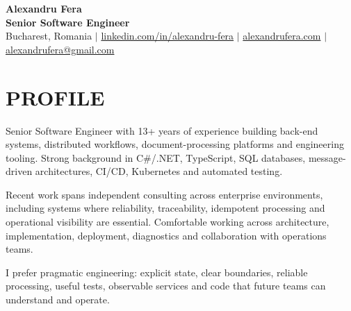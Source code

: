 \documentclass[letterpaper,11pt]{article}
\begin{document}
\begin{center}
    \textbf{\Huge Alexandru Fera} \\ \vspace{5pt}
    \textbf{Senior Software Engineer} \\ \vspace{5pt}
    Bucharest, Romania \hspace{1pt} $|$
    \href{https://www.linkedin.com/in/alexandru-fera/}{linkedin.com/in/alexandru-fera} \hspace{1pt} $|$
    \href{https://alexandrufera.com}{alexandrufera.com} \hspace{1pt} $|$
    \href{mailto:alexandrufera@gmail.com}{alexandrufera@gmail.com}
    \\ \vspace{-3pt}
\end{center}

\section{PROFILE}
\small{
Senior Software Engineer with 13+ years of experience building back-end systems, distributed workflows, document-processing platforms and engineering tooling. Strong background in C\#/.NET, TypeScript, SQL databases, message-driven architectures, CI/CD, Kubernetes and automated testing.


\vspace{4pt}
Recent work spans independent consulting across enterprise environments, including systems where reliability, traceability, idempotent processing and operational visibility are essential. Comfortable working across architecture, implementation, deployment, diagnostics and collaboration with operations teams.

\vspace{4pt}
I prefer pragmatic engineering: explicit state, clear boundaries, reliable processing, useful tests, observable services and code that future teams can understand and operate.
}
\end{document}
